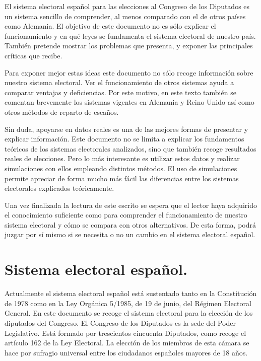 \documentclass[11pt]{article}
\begin{document}
	El sistema electoral español para las elecciones al Congreso de los Diputados es un sistema sencillo de comprender, al menos comparado con el de otros países como Alemania. El objetivo de este documento no es sólo explicar el funcionamiento y en qué leyes se fundamenta el sistema electoral de nuestro país. También pretende mostrar los problemas que presenta, y exponer las principales críticas que recibe. 
	
	Para exponer mejor estas ideas este documento no sólo recoge información sobre nuestro sistema electoral. Ver el funcionamiento de otros sistemas ayuda a comparar ventajas y deficiencias. Por este motivo, en este texto también se comentan brevemente los sistemas vigentes en Alemania y Reino Unido así como otros métodos de reparto de escaños.
	
	Sin duda, apoyarse en datos reales es una de las mejores formas de presentar y explicar información. Este documento no se limita a explicar los fundamentos teóricos de los sistemas electorales analizados, sino que también recoge resultados reales de elecciones. Pero lo más interesante es utilizar estos datos y realizar simulaciones con ellos empleando distintos métodos. El uso de simulaciones permite apreciar de forma mucho más fácil las diferencias entre los sistemas electorales explicados teóricamente.
	
	Una vez finalizada la lectura de este escrito se espera que el lector haya adquirido el conocimiento suficiente como para comprender el funcionamiento de nuestro sistema electoral y cómo se compara con otros alternativos. De esta forma, podrá juzgar por sí mismo si se necesita o no un cambio en el sistema electoral español.
		
	\newpage
	
	\section{Sistema electoral español.}
	
	Actualmente el sistema electoral español está sustentado tanto en la Constitución de 1978 como en la Ley Orgánica 5/1985, de 19 de junio, del Régimen Electoral General. En este documento se recoge el sistema electoral para la elección de los diputados del Congreso. El Congreso de los Diputados es la sede del Poder Legislativo. Está formado por trescientos cincuenta Diputados, como recoge el artículo 162 de la Ley Electoral. La elección de los miembros de esta cámara se hace por sufragio universal entre los ciudadanos españoles mayores de 18 años.
	
\end{document}
